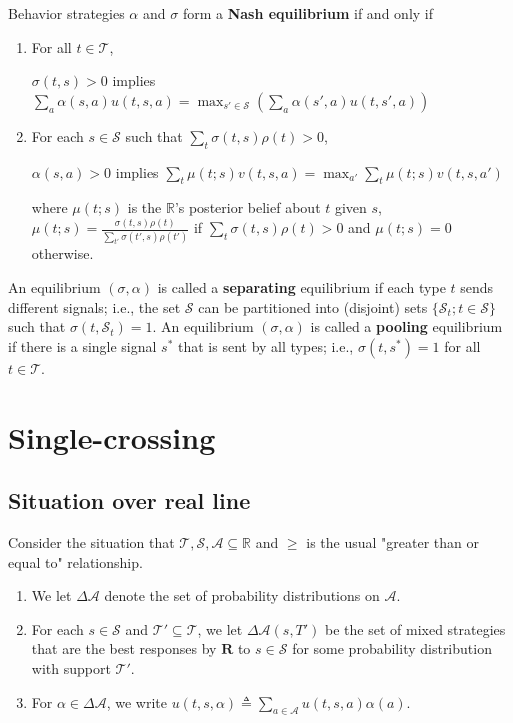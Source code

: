 \documentclass[11pt]{elegantbook}
\begin{document}
\begin{definition}
    \normalfont
    Behavior strategies $\alpha$ and $\sigma$ form a \textbf{Nash equilibrium} if and only if
    \begin{enumerate}
        \item For all $t\in \mathcal{T}$,
        \begin{center}
            $\sigma(t,s)>0$ implies $\sum_a \alpha(s,a)u(t,s,a) = \max_{s'\in \mathcal{S}}\left(\sum_a \alpha(s',a)u(t,s',a)\right)$
        \end{center}
        \item For each $s\in \mathcal{S}$ such that $\sum_{t}\sigma(t,s)\rho(t)>0$,
        \begin{center}
            $\alpha(s,a)>0$ implies $\sum_{t}\mu(t;s)v(t,s,a) = \max_{a'}\sum_{t}\mu(t;s)v(t,s,a')$
        \end{center}
        where $\mu(t;s)$ is the $\mathbb{R}$'s posterior belief about $t$ given $s$, $\mu(t;s)=\frac{\sigma(t,s)\rho(t)}{\sum_{t'}\sigma(t',s)\rho(t')}$ if $\sum_t\sigma(t,s)\rho(t)>0$ and $\mu(t;s)=0$ otherwise.
    \end{enumerate}
\end{definition}

\begin{definition}
    \normalfont
    An equilibrium $(\sigma,\alpha)$ is called a \textbf{separating} equilibrium if each type $t$ sends different signals; i.e., the set $\mathcal{S}$ can be partitioned into (disjoint) sets $\{\mathcal{S}_t; t\in \mathcal{S}\}$ such that $\sigma(t, \mathcal{S}_t) = 1$. An equilibrium $(\sigma,\alpha)$ is called a \textbf{pooling} equilibrium if there is a single signal $s^*$ that is sent by all types; i.e., $\sigma(t, s^*) = 1$ for all $t\in \mathcal{T}$.
\end{definition}


\section{Single-crossing}

\subsection{Situation over real line}
Consider the situation that $\mathcal{T},\mathcal{S},\mathcal{A}\subseteq \mathbb{R}$ and $\geq$ is the usual "greater than or equal to" relationship.

\begin{enumerate}
    \item We let $\Delta \mathcal{A}$ denote the set of probability distributions on $\mathcal{A}$.
    \item For each $s\in \mathcal{S}$ and $\mathcal{T}'\subseteq \mathcal{T}$, we let $\Delta\mathcal{A}(s,T')$ be the set of mixed strategies that are the best responses by $\mathbf{R}$ to $s\in \mathcal{S}$ for some probability distribution with support $\mathcal{T}'$.
    \item For $\alpha\in \Delta\mathcal{A}$, we write $u(t,s,\alpha)\triangleq \sum_{a\in \mathcal{A}}u(t,s,a)\alpha(a)$.
\end{enumerate}
\end{document}
